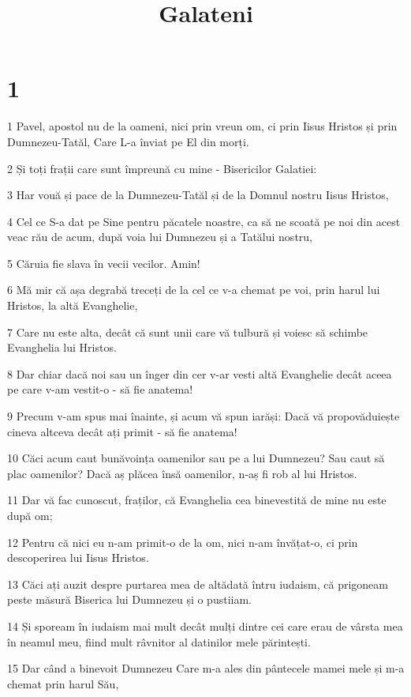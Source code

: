 

\title{Galateni}

\chapter{1}

\par 1 Pavel, apostol nu de la oameni, nici prin vreun om, ci prin Iisus Hristos și prin Dumnezeu-Tatăl, Care L-a înviat pe El din morți.
\par 2 Și toți frații care sunt împreună cu mine - Bisericilor Galatiei:
\par 3 Har vouă și pace de la Dumnezeu-Tatăl și de la Domnul nostru Iisus Hristos,
\par 4 Cel ce S-a dat pe Sine pentru păcatele noastre, ca să ne scoată pe noi din acest veac rău de acum, după voia lui Dumnezeu și a Tatălui nostru,
\par 5 Căruia fie slava în vecii vecilor. Amin!
\par 6 Mă mir că așa degrabă treceți de la cel ce v-a chemat pe voi, prin harul lui Hristos, la altă Evanghelie,
\par 7 Care nu este alta, decât că sunt unii care vă tulbură și voiesc să schimbe Evanghelia lui Hristos.
\par 8 Dar chiar dacă noi sau un înger din cer v-ar vesti altă Evanghelie decât aceea pe care v-am vestit-o - să fie anatema!
\par 9 Precum v-am spus mai înainte, și acum vă spun iarăși: Dacă vă propovăduiește cineva altceva decât ați primit - să fie anatema!
\par 10 Căci acum caut bunăvoința oamenilor sau pe a lui Dumnezeu? Sau caut să plac oamenilor? Dacă aș plăcea însă oamenilor, n-aș fi rob al lui Hristos.
\par 11 Dar vă fac cunoscut, fraților, că Evanghelia cea binevestită de mine nu este după om;
\par 12 Pentru că nici eu n-am primit-o de la om, nici n-am învățat-o, ci prin descoperirea lui Iisus Hristos.
\par 13 Căci ați auzit despre purtarea mea de altădată întru iudaism, că prigoneam peste măsură Biserica lui Dumnezeu și o pustiiam.
\par 14 Și spoream în iudaism mai mult decât mulți dintre cei care erau de vârsta mea în neamul meu, fiind mult râvnitor al datinilor mele părintești.
\par 15 Dar când a binevoit Dumnezeu Care m-a ales din pântecele mamei mele și m-a chemat prin harul Său,
